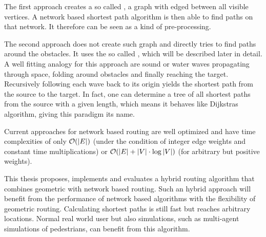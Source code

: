 The first approach creates a so called , a graph with edged between all visible vertices\citationNeeded.
A network based shortest path algorithm is then able to find paths on that network.
It therefore can be seen as a kind of pre-processing.

The second approach does not create such graph and directly tries to find paths around the obstacles.
It uses the so called , which will be described later in detail.
A well fitting analogy for this approach are sound or water waves propagating through space, folding around obstacles and finally reaching the target.
Recursively following each wave back to its origin yields the shortest path from the source to the target\citationNeeded.
In fact, one can determine a tree of all shortest paths from the source with a given length, which means it behaves like Dijkstras algorithm, giving this paradigm its name.

Current approaches for network based routing are well optimized and have time complexities of only $\mathcal{O}(|E|)$ (under the condition of integer edge weights and constant time multiplications) or $\mathcal{O}(|E| + |V| \cdot \log{|V|})$ (for arbitrary but positive weights)\citationNeeded.

This thesis proposes, implements and evaluates a hybrid routing algorithm that combines geometric with network based routing.
Such an hybrid approach will benefit from the performance of network based algorithms with the flexibility of geometric routing.
Calculating shortest paths is still fast but reaches arbitrary locations.
Normal real world user but also simulations, such as multi-agent simulations of pedestrians, can benefit from this algorithm.